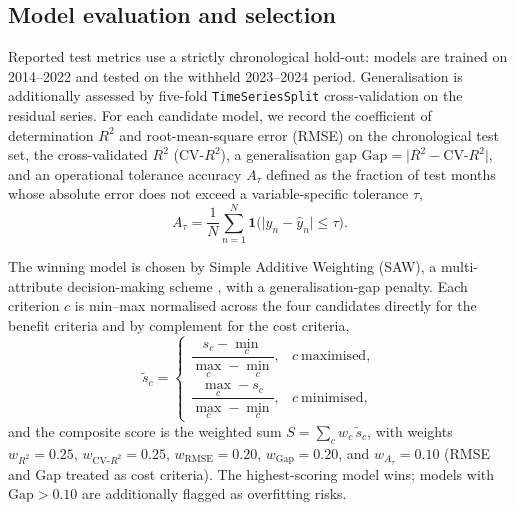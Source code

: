 \documentclass[review,11pt]{elsarticle}
\begin{document}
\subsection{Model evaluation and selection}\label{sec:saw}
Reported test metrics use a strictly chronological hold-out: models are trained
on 2014--2022 and tested on the withheld 2023--2024 period. Generalisation is
additionally assessed by five-fold \texttt{TimeSeriesSplit} cross-validation on
the residual series. For each candidate model, we record the coefficient of
determination $R^{2}$ and root-mean-square error (RMSE) on the chronological
test set, the cross-validated $R^{2}$ ($\mathrm{CV}\text{-}R^{2}$), a
generalisation gap $\mathrm{Gap}=\lvert R^{2}-\mathrm{CV}\text{-}R^{2}\rvert$,
and an operational tolerance accuracy $A_{\tau}$ defined as the fraction of test
months whose absolute error does not exceed a variable-specific tolerance
$\tau$,
\begin{equation}
A_{\tau}=\frac{1}{N}\sum_{n=1}^{N}\mathbf{1}\!\big(\lvert y_{n}-\hat{y}_{n}\rvert
\le \tau\big).
\end{equation}

The winning model is chosen by Simple Additive Weighting (SAW), a multi-attribute
decision-making scheme \citep{Hwang1981}, with a generalisation-gap penalty. Each criterion $c$ is min--max normalised across the
four candidates directly for the benefit criteria and by complement for the cost
criteria,
\begin{equation}
\tilde{s}_{c}=
\begin{cases}
\dfrac{s_{c}-\min_{c}}{\max_{c}-\min_{c}}, & c\ \text{maximised},\\[1.2ex]
\dfrac{\max_{c}-s_{c}}{\max_{c}-\min_{c}}, & c\ \text{minimised},
\end{cases}
\end{equation}
and the composite score is the weighted sum
$S=\sum_{c} w_{c}\,\tilde{s}_{c}$, with weights $w_{R^{2}}=0.25$,
$w_{\mathrm{CV}\text{-}R^{2}}=0.25$, $w_{\mathrm{RMSE}}=0.20$,
$w_{\mathrm{Gap}}=0.20$, and $w_{A_{\tau}}=0.10$ (RMSE and Gap treated as cost
criteria). The highest-scoring model wins; models with $\mathrm{Gap}>0.10$ are
additionally flagged as overfitting risks.
\end{document}
